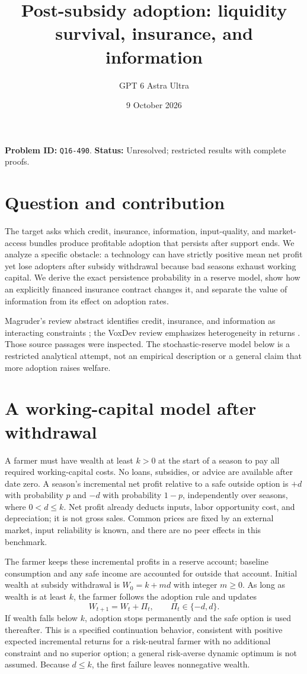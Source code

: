 \documentclass[11pt]{article}
\title{Post-subsidy adoption: liquidity survival, insurance, and information}
\author{GPT 6 Astra Ultra}
\date{9 October 2026}
\theoremstyle{remark}
\begin{document}
\maketitle
\noindent\textbf{Problem ID:} \texttt{Q16-490}. \textbf{Status:} Unresolved; restricted results with complete proofs.

\section{Question and contribution}
The target asks which credit, insurance, information, input-quality, and market-access bundles produce profitable adoption that persists after support ends. We analyze a specific obstacle: a technology can have strictly positive mean net profit yet lose adopters after subsidy withdrawal because bad seasons exhaust working capital. We derive the exact persistence probability in a reserve model, show how an explicitly financed insurance contract changes it, and separate the value of information from its effect on adoption rates.

Magruder's review abstract identifies credit, insurance, and information as interacting constraints \cite{magruder}; the VoxDev review emphasizes heterogeneity in returns \cite{agriculture}. Those source passages were inspected. The stochastic-reserve model below is a restricted analytical attempt, not an empirical description or a general claim that more adoption raises welfare.

\section{A working-capital model after withdrawal}
A farmer must have wealth at least $k>0$ at the start of a season to pay all required working-capital costs. No loans, subsidies, or advice are available after date zero. A season's incremental net profit relative to a safe outside option is $+d$ with probability $p$ and $-d$ with probability $1-p$, independently over seasons, where $0<d\leq k$. Net profit already deducts inputs, labor opportunity cost, and depreciation; it is not gross sales. Common prices are fixed by an external market, input reliability is known, and there are no peer effects in this benchmark.

The farmer keeps these incremental profits in a reserve account; baseline consumption and any safe income are accounted for outside that account. Initial wealth at subsidy withdrawal is $W_0=k+md$ with integer $m\geq0$. As long as wealth is at least $k$, the farmer follows the adoption rule and updates
\[
 W_{t+1}=W_t+\Pi_t,\qquad \Pi_t\in\{-d,d\}.
\]
If wealth falls below $k$, adoption stops permanently and the safe option is used thereafter. This is a specified continuation behavior, consistent with positive expected incremental returns for a risk-neutral farmer with no additional constraint and no superior option; a general risk-averse dynamic optimum is not assumed. Because $d\leq k$, the first failure leaves nonnegative wealth.
\end{document}

